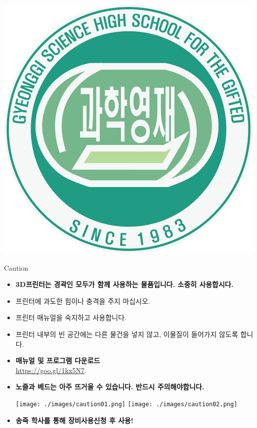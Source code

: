 \documentclass[a0paper,portrait]{baposter}
\begin{document}
\begin{poster}
{  \includegraphics[height=0.75\headerheight]{./logo/gshslogo_green.png}
}


\begin{posterbox}[name=caution,column=0,row=0]{Caution}
\begin{itemize}
  \item \textbf{3D프린터는 경곽인 모두가 함께 사용하는 물품입니다. 소중히 사용합시다.}\
  \item 프린터에 과도한 힘이나 충격을 주지 마십시오.
  \item 프린터 매뉴얼을 숙지하고 사용합니다.
  \item 프린터 내부의 빈 공간에는 다른 물건을 넣지 않고, 이물질이 들어가지 않도록 합니다.
  \item \textbf{매뉴얼 및 프로그램 다운로드} \\ \url{https://goo.gl/1kx5N7}.
  \item \color{aaublue5} \textbf{노즐과 베드는 아주 뜨거울 수 있습니다. 반드시 주의해야합니다.} 
  \begin{center}
  	\texttt{[image: ./images/caution01.png]}
  	\texttt{[image: ./images/caution02.png]}
  \end{center}
	\item \color{aaublue5} \textbf{송죽 학사를 통해 장비사용신청 후 사용!}
\end{itemize}
\end{posterbox}


\end{poster}
\end{document}
